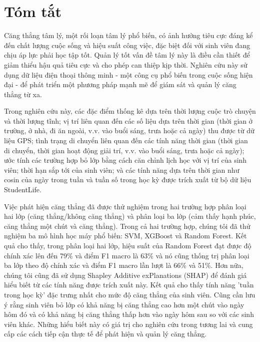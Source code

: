 \section*{Tóm tắt}
\thispagestyle{empty}
\fontsize{13}{16}
\selectfont
Căng thẳng tâm lý, một rối loạn tâm lý phổ biến, có ảnh hưởng tiêu cực đáng kể đến chất lượng cuộc sống và hiệu suất công việc, đặc biệt đối với sinh viên đang chịu áp lực phải học tập tốt. Quản lý tốt vấn đề tâm lý này là điều cần thiết để giảm thiểu hậu quả tiêu cực và cho phép can thiệp kịp thời. Nghiên cứu này sử dụng dữ liệu điện thoại thông minh - một công cụ phổ biến trong cuộc sống hiện đại - để phát triển một phương pháp mạnh mẽ để giám sát và quản lý căng thẳng từ xa.

Trong nghiên cứu này, các đặc điểm thống kê dựa trên thời lượng cuộc trò chuyện và thời lượng tĩnh; vị trí liên quan đến các số liệu dựa trên thời gian (thời gian ở trường, ở nhà, đi ăn ngoài, v.v. vào buổi sáng, trưa hoặc cả ngày) thu được từ dữ liệu GPS; tình trạng di chuyển liên quan đến các tính năng thời gian (thời gian di chuyển, thời gian hoạt động giải trí, v.v. vào buổi sáng, trưa hoặc cả ngày); ước tính các trường hợp bỏ lớp bằng cách căn chỉnh lịch học với vị trí của sinh viên; thời hạn sắp tới của sinh viên; và các tính năng dựa trên thời gian như cosin của ngày trong tuần và tuần số trong học kỳ được trích xuất từ bộ dữ liệu StudentLife.

Việc phát hiện căng thẳng đã được thử nghiệm trong hai trường hợp phân loại hai lớp (căng thẳng/không căng thẳng) và phân loại ba lớp (cảm thấy hạnh phúc, căng thẳng một chút và căng thẳng). Trong cả hai trường hợp, chúng tôi đã thử nghiệm ba mô hình học máy phổ biến: SVM, XGBoost và Random Forest. Kết quả cho thấy, trong phân loại hai lớp, hiệu suất của Random Forest đạt được độ chính xác lên đến 79\% và điểm F1 macro là 63\% và nó cũng thống trị phân loại ba lớp theo độ chính xác và điểm F1 macro lần lượt là 66\% và 51\%. Hơn nữa, chúng tôi cũng đã sử dụng Shapley Additive exPlanations (SHAP) để đánh giá hiểu biết từ các tính năng được trích xuất này. Kết quả cho thấy tính năng 'tuần trong học kỳ' đặc trưng nhất cho mức độ căng thẳng của sinh viên. Cũng cần lưu ý rằng sinh viên bỏ lớp có khả năng bị căng thẳng cao hơn một chút vào ngày hôm đó và có khả năng bị căng thẳng thấp hơn vào ngày hôm sau so với các sinh viên khác. Những hiểu biết này có giá trị cho nghiên cứu trong tương lai và cung cấp các cách tiếp cận thực tế để phát hiện và quản lý căng thẳng.

\clearpage
{}
